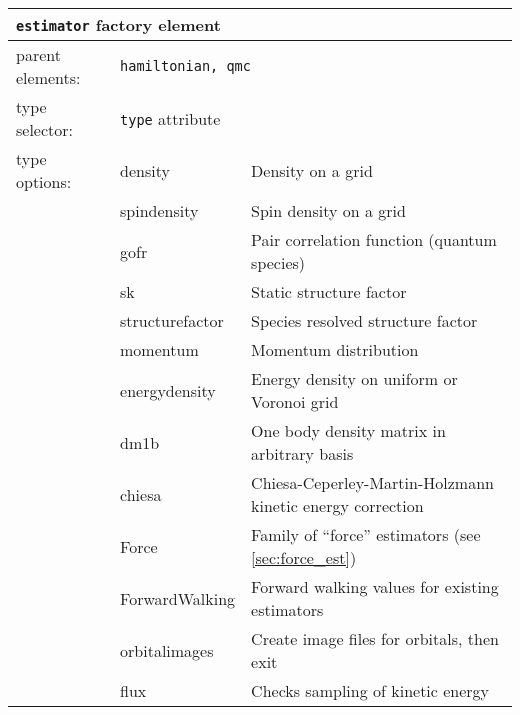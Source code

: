 \FloatBarrier
\begin{table}[h]
\begin{center}
\begin{tabularx}{\textwidth}{l l l l l l }
\hline
\multicolumn{6}{l}{\texttt{estimator} factory element} \\
\hline
\multicolumn{2}{l}{parent elements:} & \multicolumn{4}{l}{\texttt{hamiltonian, qmc}}\\
\multicolumn{2}{l}{type   selector:} & \multicolumn{4}{l}{\texttt{type} attribute}\\
\multicolumn{2}{l}{type   options: } & density            & \multicolumn{3}{l}{Density on a grid}\\
\multicolumn{2}{l}{                } & spindensity        & \multicolumn{3}{l}{Spin density on a grid}\\
\multicolumn{2}{l}{                } & gofr               & \multicolumn{3}{l}{Pair correlation function (quantum species)}\\
\multicolumn{2}{l}{                } & sk                 & \multicolumn{3}{l}{Static structure factor}\\
\multicolumn{2}{l}{                } & structurefactor    & \multicolumn{3}{l}{Species resolved structure factor}\\
\multicolumn{2}{l}{                } & momentum           & \multicolumn{3}{l}{Momentum distribution}\\
\multicolumn{2}{l}{                } & energydensity      & \multicolumn{3}{l}{Energy density on uniform or Voronoi grid}\\
\multicolumn{2}{l}{                } & dm1b               & \multicolumn{3}{l}{One body density matrix in arbitrary basis}\\
\multicolumn{2}{l}{                } & chiesa             & \multicolumn{3}{l}{Chiesa-Ceperley-Martin-Holzmann kinetic energy correction}\\
\multicolumn{2}{l}{                } & Force              & \multicolumn{3}{l}{Family of ``force'' estimators (see \ref{sec:force_est})}\\
\multicolumn{2}{l}{                } & ForwardWalking     & \multicolumn{3}{l}{Forward walking values for existing estimators}\\
\multicolumn{2}{l}{                } & orbitalimages      & \multicolumn{3}{l}{Create image files for orbitals, then exit}\\
\multicolumn{2}{l}{                } & flux               & \multicolumn{3}{l}{Checks sampling of kinetic energy}\\

\end{tabularx}
\end{center}
\end{table}

